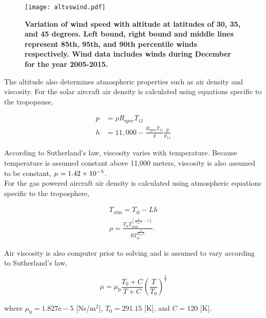 \documentclass[]{aiaa-tc}%
\begin{document}
\begin{figure}[H]
	\begin{center}
	\texttt{[image: altvswind.pdf]}
    \caption{\textbf{Variation of wind speed with altitude at latitudes of 30, 35, and 45 degrees.  Left bound, right bound and middle lines represent 85th, 95th, and 90th percentile winds respectively. Wind data includes winds during December for the year 2005-2015.}}
	\label{f:altvswind}
	\end{center}
\end{figure}

The altitude also determines atmospheric properties such as air density and viscosity.  For the solar aircraft air density is calculated using equations specific to the tropopause,\cite{isaatm} 

\begin{align}
    \label{e:tropopress}
    p &= \rho R_{\text{spec}}T_{11} \\
    \label{e:tropoalt}
    h &= 11,000 - \frac{R_{\text{spec}}T_{11}}{g}\frac{p}{p_{11}} 
\end{align}

According to Sutherland's law\cite{fluiddyhandbook}, viscosity varies with temperature.  Because temperature is assumed constant above 11,000 meters\cite{isaatm}, viscosity is also assumed to be constant, $\mu=\num{1.42d-5}$. \\

For the gas powered aircraft air density is calculated using atmospheric equations specific to the troposphere,\cite{isaatm} 

\begin{align}
    \label{e:Talt}
    T_{\text{atm}} = T_{\text{sl}} - Lh \\
    \label{e:rhot}
    \rho = \frac{T_{\text{sl}}T_{\text{atm}}^{\left( \frac{g}{R_{\text{spec}}L} -1 \right)}}{R T_{\text{sl}}^{\frac{g}{R_{\text{spec}}L}}}.
\end{align}

Air viscosity is also computer prior to solving and is assumed to vary according to Sutherland's law,\cite{fluiddyhandbook}

\begin{equation}
    \label{e:sutherland}
    \mu = \mu_0 \frac{T_0 + C}{T+C} \left( \frac{T}{T_0} \right)^{\frac{3}{2}}
\end{equation}

where $\mu_0 = 1.827\text{e}-5$ [Ns/m$^2$], $T_0 = 291.15$ [K], and $C = 120$ [K].
\end{document}
